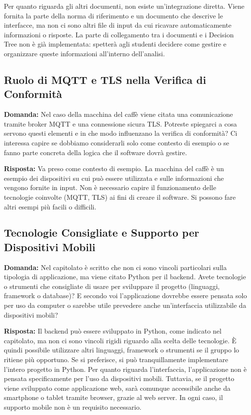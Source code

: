 \documentclass[a4paper,12pt]{article}
\begin{document}
{    Per quanto riguarda gli altri documenti, non esiste un'integrazione diretta. Viene fornita la parte della norma di riferimento e un documento che descrive le interfacce, ma non ci sono altri file di input da cui ricavare automaticamente informazioni o risposte. La parte di collegamento tra i documenti e i Decision Tree non è già implementata: spetterà agli studenti decidere come gestire e organizzare queste informazioni all'interno dell'analisi.


    \subsection{Ruolo di MQTT e TLS nella Verifica di Conformità}
    \textbf{Domanda:} Nel caso della macchina del caffè viene citata una comunicazione tramite broker MQTT e una connessione sicura TLS. Potreste spiegarci a cosa servono questi elementi e in che modo influenzano la verifica di conformità? Ci interessa capire se dobbiamo considerarli solo come contesto di esempio o se fanno parte concreta della logica che il software dovrà gestire.

    \textbf{Risposta:} Va preso come contesto di esempio. La macchina del caffè è un esempio dei dispositivi su cui può essere utilizzata e sulle informazioni che vengono fornite in input. Non è necessario capire il funzionamento delle tecnologie coinvolte (MQTT, TLS) ai fini di creare il software. Si possono fare altri esempi più facili o difficili.

    \subsection{Tecnologie Consigliate e Supporto per Dispositivi Mobili}
    \textbf{Domanda:} Nel capitolato è scritto che non ci sono vincoli particolari sulla tipologia di applicazione, ma viene citato Python per il backend. Avete tecnologie o strumenti che consigliate di usare per sviluppare il progetto (linguaggi, framework o database)? E secondo voi l'applicazione dovrebbe essere pensata solo per uso da computer o sarebbe utile prevedere anche un'interfaccia utilizzabile da dispositivi mobili?

    \textbf{Risposta:} Il backend può essere sviluppato in Python, come indicato nel capitolato, ma non ci sono vincoli rigidi riguardo alla scelta delle tecnologie. È quindi possibile utilizzare altri linguaggi, framework o strumenti se il gruppo lo ritiene più opportuno. Se si preferisce, si può tranquillamente implementare l'intero progetto in Python. Per quanto riguarda l'interfaccia, l'applicazione non è pensata specificamente per l'uso da dispositivi mobili. Tuttavia, se il progetto viene sviluppato come applicazione web, sarà comunque accessibile anche da smartphone o tablet tramite browser, grazie al web server. In ogni caso, il supporto mobile non è un requisito necessario.

}
\end{document}
